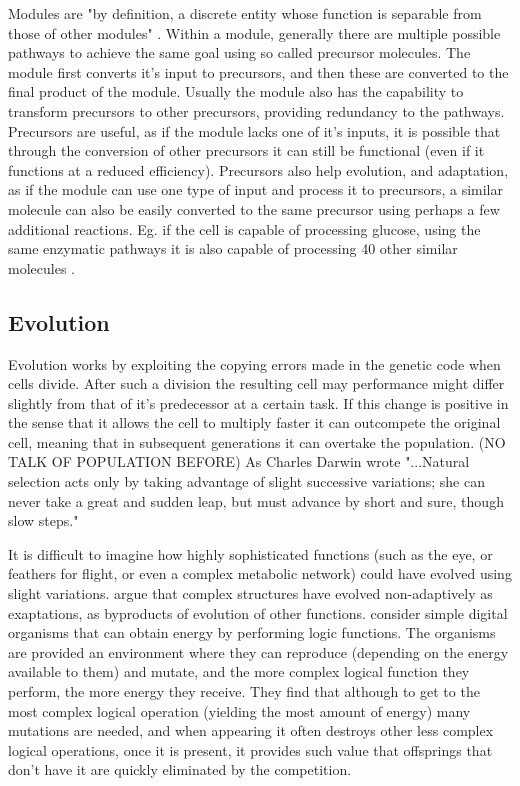 \documentclass[10pt,a4paper]{article}
\begin{document}
	Modules are "by definition, a discrete entity whose function is separable from those of other modules" \cite{modulardef}. Within a module, generally there are multiple possible pathways to achieve the same goal using so called precursor molecules. The module first converts it's input to precursors, and then these are converted to the final product of the module. Usually the module also has the capability to transform precursors to other precursors, providing redundancy to the pathways. Precursors are useful, as if the module lacks one of it's inputs, it is possible that through the conversion of other precursors it can still be functional (even if it functions at a reduced efficiency). Precursors also help evolution, and adaptation, as if the module can use one type of input and process it to precursors, a similar molecule can also be easily converted to the same precursor using perhaps a few additional reactions. Eg. if the cell is capable of processing glucose, using the same enzymatic pathways it is also capable of processing 40 other similar molecules \cite{latent}.
	
	
	
	\subsection{Evolution}\label{chap:evolution}
	
	Evolution works by exploiting the copying errors made in the genetic code when cells divide. After such a division the resulting cell may performance might differ slightly from that of it's predecessor at a certain task. If this change is positive in the sense that it allows the cell to multiply faster it can outcompete the original cell, meaning that in subsequent generations it can overtake the population. (NO TALK OF POPULATION BEFORE) As Charles Darwin wrote "...Natural selection acts only by taking advantage of slight successive variations; she can never take a great and sudden leap, but must advance by short and sure, though slow steps." \cite{darwin} 
	
	It is difficult to imagine how highly sophisticated functions (such as the eye, or feathers for flight, or even a complex metabolic network) could have evolved using slight variations. \cite{latent} argue that complex structures have evolved non-adaptively as exaptations, as byproducts of evolution of other functions. \cite{complexfeatures}  consider simple digital organisms that can obtain energy by performing logic functions. The organisms are provided an environment where they can reproduce (depending on the energy available to them) and mutate, and the more complex logical function they perform, the more energy they receive. They find that although to get to the most complex logical operation (yielding the most amount of energy) many mutations are needed, and when appearing it often destroys other less complex logical operations, once it is present, it provides such value that offsprings that don't have it are quickly eliminated by the competition.
	
\end{document}
